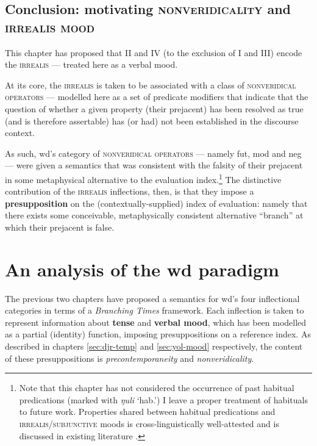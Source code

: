 \section{Conclusion: motivating \textsc{nonveridicality} and \textsc{irrealis mood}}


This chapter has proposed that \gls{II} and \gls{IV} (to the exclusion of \gls{I} and \gls{III}) encode the \textsc{irrealis} --- treated here as a verbal mood.

At its core, the \textsc{irrealis} is taken to be associated with a class of \textsc{nonveridical operators} --- modelled here as a set of predicate modifiers that indicate that the question of whether a given property (their prejacent) has been resolved as true (and is therefore assertable) has (or had) not been established in the discourse context. 

As such, \gls{wd}'s category of \textsc{nonveridical operators} --- namely \gls{fut}, \gls{mod} and \gls{neg} --- were given a semantics that was consistent with the falsity of their prejacent in some metaphysical alternative to the evaluation index.\footnote{Note that this chapter has not considered the occurrence of past habitual predications (marked with \textit{ŋuli} `\gls{hab}.') I leave a proper treatment of habituals to future work. Properties shared between habitual predications and \textsc{irrealis/subjunctive} moods is cross-linguistically well-attested and is discussed in existing literature \citep[\textit{e.g.},][]{Ferreira2016,Giannakidou1995,VonPrince2019a,Boneh2008}.} The distinctive contribution of the \textsc{irrealis} inflections, then, is that they impose a \textbf{presupposition} on the (contextually-supplied) index of evaluation: namely that there exists some conceivable, metaphysically consistent alternative ``branch'' at which their prejacent is false.






\chapter{An analysis of the \gls{wd} paradigm}\label{ch:paradigm}

The previous two chapters have proposed a semantics for \gls{wd}'s four inflectional categories in terms of a \textit{Branching Times} framework. Each inflection is taken to represent information about \textbf{tense} and \textbf{verbal mood}, which has been modelled as a partial (identity) function, imposing presuppositions on a reference index. As described in chapters \ref{sec:djr-temp} and \ref{sec:yol-mood} respectively, the content of these presuppositions is \textit{precontemporaneity} and \textit{nonveridicality}.

